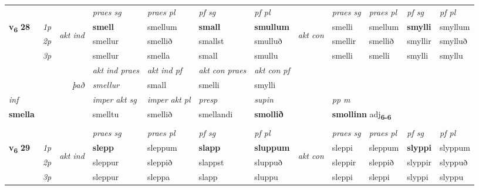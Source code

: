 \begin{longtable}[l]{X>{\footnotesize\itshape}llXXXXlXXXX}
 & &   & \textit{praes sg}  & \textit{praes pl}    & \textit{ pf sg} & \textit{pf pl} & & \textit{praes sg}  & \textit{praes pl}    & \textit{pf sg} & \textit{pf pl }  \\ \cmidrule{4-7} \cmidrule{9-12}
 \multirow{2}{*}{{{\textbf{v{\textsubscript{6}}} \Large{\textbf{28}}}}}  & 1p & \multirow{3}{*}{\begin{turn}{90}\textit{akt ind}\end{turn}} & \textbf{smell} & smellum & \textbf{small} & \textbf{smullum} & \multirow{3}{*}{\begin{turn}{90}\textit{akt con}\end{turn}} &smelli & smellum & \textbf{smylli} & smyllum\\*
 & 2p &  &  smellur  & smellið & smallst & smulluð & & smellir & smellið & smyllir & smylluð \\*
 & 3p &  & smellur & smella & small & smullu & & smelli & smelli& smylli & smyllu \\*
\cmidrule{4-7} \cmidrule{9-12}

   && &  \textit{akt ind praes} & \textit{akt ind pf} & \textit{akt con praes} & \textit{akt con pf} \\*
\multicolumn{3}{r}{\textit{það}} & smellur & small & smelli & smylli \\*

\cmidrule{4-7}
   {\textit{inf}} & &  & \textit{imper akt sg} & \textit{imper akt pl}   & \textit{presp} & \textit{supin}  && \textit{pp m} \\*
  {\textbf{smella}} & && smelltu  & smellið   & smellandi &  \textbf{smollið}  && \multicolumn{2}{l}{\textbf{smollinn} adj\textbf{\textsubscript{6-6}}} \\*

\midrule
  & \\
   \midrule
 & &   & \textit{praes sg}  & \textit{praes pl}    & \textit{ pf sg} & \textit{pf pl} & & \textit{praes sg}  & \textit{praes pl}    & \textit{pf sg} & \textit{pf pl }  \\ \cmidrule{4-7} \cmidrule{9-12}
 \multirow{2}{*}{{{\textbf{v{\textsubscript{6}}} \Large{\textbf{29}}}}}  & 1p & \multirow{3}{*}{\begin{turn}{90}\textit{akt ind}\end{turn}} & \textbf{slepp} & sleppum & \textbf{slapp} & \textbf{sluppum} & \multirow{3}{*}{\begin{turn}{90}\textit{akt con}\end{turn}} &sleppi & sleppum & \textbf{slyppi} & slyppum\\*
 & 2p &  &  sleppur  & sleppið & slappst & sluppuð & & sleppir & sleppið & slyppir & slyppuð \\*
 & 3p &  & sleppur & sleppa & slapp & sluppu & & sleppi & sleppi& slyppi & slyppu \\*
\cmidrule{4-7} \cmidrule{9-12}


\end{longtable}
